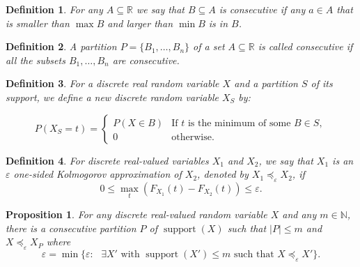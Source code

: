 \documentclass[review]{elsarticle}
\newtheorem{definition}{Definition}
\newtheorem{proposition}{Proposition}
\DeclareMathOperator{\supp}{support}
\begin{document}
\begin{definition}\label{consecutive} For any $A \subseteq \mathbb{R}$ we say that
$B \subseteq A$ is \emph{consecutive} if any $a\in A$ that is smaller than $\max B$ and larger than $\min B$ is in $B$.
\end{definition}

\begin{definition}\label{part_consecutive} A partition $P=\{B_1,\dots,B_n\}$ of a set $A \subseteq \mathbb{R}$ is called 
\emph{consecutive} if all the subsets $B_1 ,\dots,B_n$ are consecutive.
\end{definition}


\begin{definition}\label{partition}
	For a discrete real random variable $X$ and a partition $S$ of its support, we define a new discrete random variable $X_S$ by:
	
	$$P(X_S = t) = \begin{cases} 
	P(X\in B) & \text{If $t$ is the minimum of some } B \in S, \\
	0      & \text{otherwise.}
	\end{cases}$$
\end{definition}


\begin{definition}
	For discrete real-valued variables $X_1$ and $X_2$, we say that $X_1$ is an $\varepsilon$ one-sided Kolmogorov approximation of $X_2$, denoted by 
	$X_1 \preceq_\varepsilon X_2$, if $$0 \leq  \max\limits_{t} (F_{X_1}(t)-F_{X_2}(t)) \leq \varepsilon.$$
\end{definition}

\begin{proposition}
	For any discrete real-valued random variable $X$ and any $m \in \mathbb{N}$, there is a consecutive partition $P$ of $\supp(X)$ such that $|P|\leq m$ and
	$X \preceq_\varepsilon X_P$ 
	where $$ \varepsilon = \min\{ \varepsilon \colon \text{ $\exists X'$ with $\supp(X')\leq m$ such that $X \preceq_\varepsilon X'$}\}.$$
\end{proposition}


\end{document}
